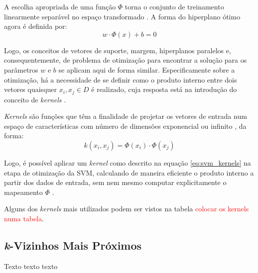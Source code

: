 A escolha apropriada de uma função $\Phi$ torna o conjunto de treinamento linearmente separável no espaço transformado \citep{lorena:03}. A forma do hiperplano ótimo agora é definida por:
\begin{equation}
\label{eq:svm_hyperplano_otimo_trasnformado}
w \cdot \Phi(x) + b = 0
\end{equation}

Logo, os conceitos de vetores de suporte, margem, hiperplanos paralelos e, consequentemente, de problema de otimização para encontrar a solução para os parâmetros $w$ e $b$ se aplicam aqui de forma similar. Especificamente sobre a otimização, há a necessidade de se definir como o produto interno entre dois vetores quaisquer $x_i, x_j \in D$ é realizado, cuja resposta está na introdução do conceito de \emph{kernels} \citep{lorena:03}.

\emph{Kernels} são funções que têm a finalidade de projetar os vetores de entrada num espaço de características com número de dimensões exponencial ou infinito \citep{taylor:04}, da forma:
\begin{equation}
\label{eq:svm_kernels}
k(x_i, x_j) =  \Phi(x_i) \cdot \Phi(x_j)
\end{equation}

Logo, é possível aplicar um \emph{kernel} como descrito na equação \ref{eq:svm_kernels} na etapa de otimização da SVM, calculando de maneira eficiente o produto interno a partir dos dados de entrada, sem nem mesmo computar explicitamente o mapeamento $\Phi$ \citep{taylor:04}.

Alguns dos \emph{kernels} mais utilizados podem ser vistos na tabela \textcolor{red}{colocar os kernels numa tabela}.




\subsection{\emph{k}-Vizinhos Mais Próximos}
Texto texto texto
\label{sec:clasificadores_knn}

\begin{comment}
\section{Exemplo de Código-Fonte em Java}
\label{sec:exemplo_codigo_fonte}

\begin{lstlisting}[frame=trbl]
   for(i = 0; i < 20; i++)
   {
       // Comentário 
       System.out.println("Mensagem...");
   }
\end{lstlisting}
\end{comment}
